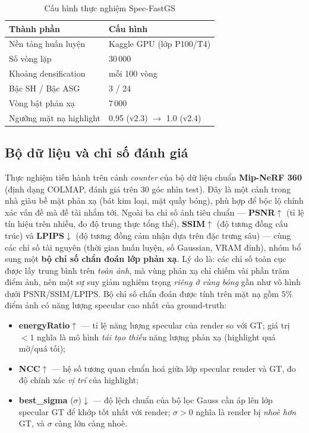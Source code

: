     \begin{table}[h]
    \centering
    \caption{Cấu hình thực nghiệm Spec-FastGS}
    \label{tab:sf_env}
    \vspace{0.2cm}
    \begin{tabular}{@{}ll@{}}
    \toprule
    \textbf{Thành phần} & \textbf{Cấu hình} \\ \midrule
    Nền tảng huấn luyện & Kaggle GPU (lớp P100/T4) \\
    Số vòng lặp & 30\,000 \\
    Khoảng densification & mỗi 100 vòng \\
    Bậc SH / Bậc ASG & 3 / 24 \\
    Vòng bật phản xạ & 7\,000 \\
    Ngưỡng mặt nạ highlight & 0.95 (v2.3) $\to$ 1.0 (v2.4) \\
    \bottomrule
    \end{tabular}
    \end{table}

    \subsection{Bộ dữ liệu và chỉ số đánh giá}
    Thực nghiệm tiến hành trên cảnh \textit{counter} của bộ dữ liệu chuẩn
    \textbf{Mip-NeRF 360} \cite{mipnerf360} (định dạng COLMAP, đánh giá trên 30 góc
    nhìn test). Đây là một cảnh trong nhà giàu bề mặt phản xạ (bát kim loại, mặt
    quầy bóng), phù hợp để bộc lộ chính xác vấn đề mà đề tài nhắm tới. Ngoài ba chỉ
    số ảnh tiêu chuẩn — \textbf{PSNR}$\uparrow$ (tỉ lệ tín hiệu trên nhiễu, đo độ
    trung thực tổng thể), \textbf{SSIM}$\uparrow$ (độ tương đồng cấu trúc) và
    \textbf{LPIPS}$\downarrow$ (độ tương đồng cảm nhận dựa trên đặc trưng sâu) —
    cùng các chỉ số tài nguyên (thời gian huấn luyện, số Gaussian, VRAM đỉnh), nhóm
    bổ sung một \textbf{bộ chỉ số chẩn đoán lớp phản xạ}. Lý do là: các chỉ số toàn
    cục được lấy trung bình trên \textit{toàn ảnh}, mà vùng phản xạ chỉ chiếm vài
    phần trăm điểm ảnh, nên một sự suy giảm nghiêm trọng \textit{riêng ở vùng bóng}
    gần như vô hình dưới PSNR/SSIM/LPIPS. Bộ chỉ số chẩn đoán được tính trên mặt nạ
    gồm $5\%$ điểm ảnh có năng lượng specular cao nhất của ground-truth:
    \begin{itemize}
        \item \textbf{energyRatio}$\uparrow$ — tỉ lệ năng lượng specular của render
        so với GT; giá trị $<1$ nghĩa là mô hình \textit{tái tạo thiếu} năng lượng
        phản xạ (highlight quá mờ/quá tối);
        \item \textbf{NCC}$\uparrow$ — hệ số tương quan chuẩn hoá giữa lớp specular
        render và GT, đo độ chính xác \textit{vị trí} của highlight;
        \item \textbf{best\_sigma} ($\sigma$)$\downarrow$ — độ lệch chuẩn của bộ lọc
        Gauss cần áp lên lớp specular GT để khớp tốt nhất với render; $\sigma > 0$
        nghĩa là render bị \textit{nhoè hơn} GT, và $\sigma$ càng lớn càng nhoè.
    \end{itemize}

